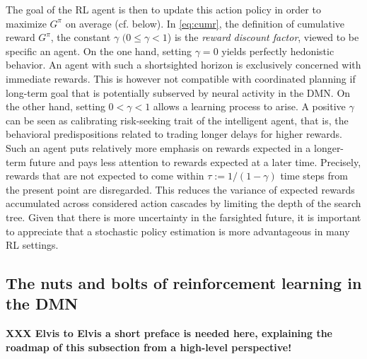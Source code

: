 \documentclass[10pt,letterpaper]{article}
\begin{document}
The goal of the RL agent is then to update this action policy in order
to maximize $G^\pi$ on average (cf. below). In \eqref{eq:cumr},
the definition of cumulative reward $G^\pi$,
the constant $\gamma$ $(0 \le \gamma < 1$) is the \textit{reward discount factor},
viewed to be specific an agent.
On the one hand,
setting $\gamma = 0$ yields perfectly hedonistic behavior.
An agent with such a shortsighted horizon is exclusively
concerned with immediate rewards.
This is however not compatible with coordinated planning if long-term goal that is
potentially subserved by neural activity in the DMN.
On the other hand,
setting $0 < \gamma < 1$ allows a learning process to arise.
A positive $\gamma$ can be seen as calibrating risk-seeking trait of the intelligent agent,
that is, the behavioral predispositions related to trading longer delays for higher rewards.
Such an agent puts relatively more emphasis on rewards expected in
a longer-term future and pays less attention to
rewards expected at a later time. Precisely, rewards that are not expected to come within $\tau := 1/(1 - \gamma)$ time steps from the present point are disregarded.
This reduces the variance of expected rewards accumulated across
considered action cascades by limiting the depth of the search tree.
Given that there is more uncertainty in the farsighted future,
it is important to appreciate that a stochastic policy estimation
is more advantageous in many RL settings.

\subsection{The nuts and bolts of reinforcement learning in the DMN}
\textbf{XXX Elvis to Elvis a short preface is needed here, explaining the roadmap of this subsection from a high-level perspective!}
\end{document}
